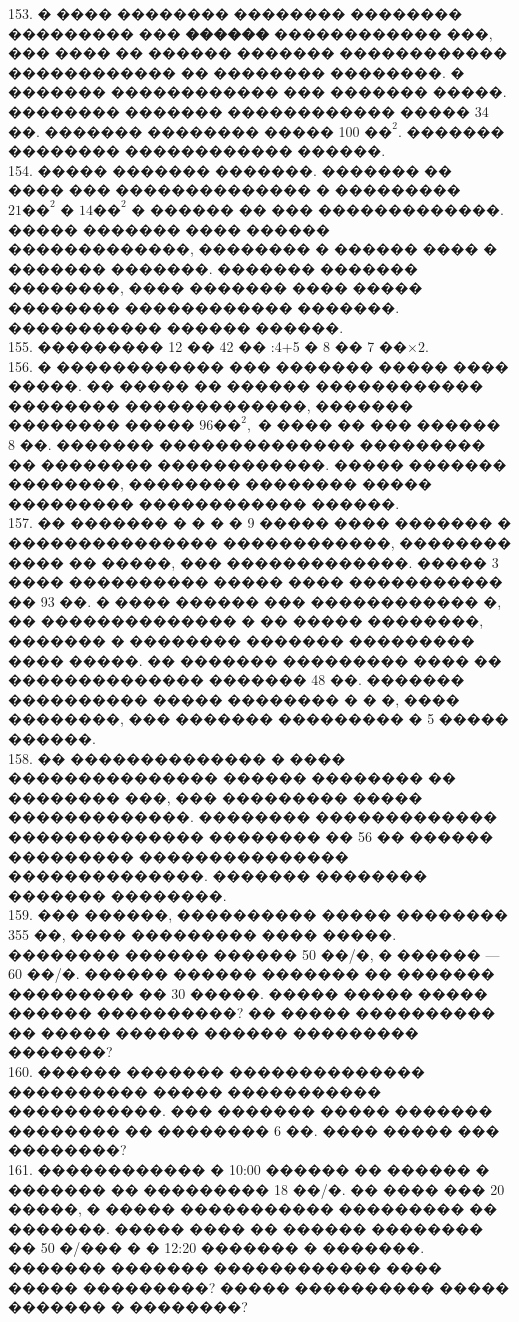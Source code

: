 \documentclass[12pt]{article}
\begin{document}
153. � ���� �������� �������� �������� ��������� ��� {\bf ������} ������������ ���, ��� ���� �� ������ ������� ������������ ������������ �� �������� ��������. � ������� ������������ ��� ������� �����. �������� ������� ������������ ����� 34 ��. ������� �������� ����� 100 $\text{��}^2.$ ������� �������� ������������ ������.\\
154. ����� ������� �������. ������� �� ���� ��� �������������� � ��������� $21\text{��}^2$ � $14\text{��}^2$ � ������ �� ��� �������������. ����� ������� ���� ������ �������������, �������� � ������ ���� � ������� �������. ������� ������� ��������, ���� ������� ���� ����� �������� ������������ �������. ����������� ������ ������.\\
155. ��������� 12 �� 42 �� :4+5 � 8 �� 7 ��$\times2.$\\
156. � ������������ ��� ������� ����� ���� �����. �� ����� �� ������ ������������ �������� �������������, ������� �������� ����� $96\text{��}^2,$ � ���� �� ��� ������ 8 ��. ������� �������������� ��������� �� �������� ������������. ����� ������� ��������, �������� �������� ����� ��������� ������������ ������.\\
157. �� ������� � � � � 9 ����� ���� ������� � ��������������� ������������, �������� ���� �� �����, ��� �������������. ����� 3 ���� ���������� ����� ���� ����������� �� 93 ��. � ���� ������ ��� ������������ �, �� �������������� � �� ����� ��������, ������� � �������� ������� ��������� ���� �����. �� ������� ��������� ���� �� �������������� ������� 48 ��. ������� ���������� ����� �������� � � �, ���� ��������, ��� ������� ��������� � 5 ����� ������.\\
158. �� �������������� � ���� ��������������� ������ �������� �� �������� ���, ��� ��������� ����� �������������. �������� ������������� �������������� �������� �� 56 �� ������ ��������� ��������������� ��������������. ������� �������� ������� ��������.\\
159. ��� ������, ���������� ����� �������� 355 ��, ���� ��������� ���� �����. �������� ������ ������ 50 ��/�, � ������ --- 60 ��/�. ������ ������ ������� �� ������� ��������� �� 30 �����. ����� ����� ����� ������ ����������? �� ����� ���������� �� ����� ������ ������ ��������� �������?\\
160. ������ ������� �������������� ���������� ����� ����������� �����������. ��� ������� ����� ������� �������� �� �������� 6 ��. ���� ����� ��� ��������?\\
161. ������������ � 10:00 ������ �� ������ � ������� �� ��������� 18 ��/�. �� ���� ��� 20 �����, � ����� ����������� ��������� �� �������. ����� ���� �� ������ �������� �� 50 �/��� � � 12:20 ������� � �������. ������� ������� ������������ ���� ����� ���������? ����� ���������� ����� ������� � ��������?\\
\end{document}
